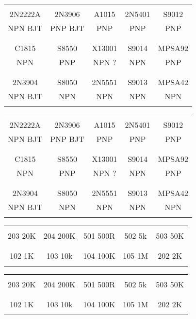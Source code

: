 \documentclass{article}
\begin{document}
\begin{center}
  \begin{tabular}{|c|c|c|c|c|}
    \hline
    &&&&\\
    2N2222A & 2N3906 & A1015 & 2N5401 & S9012 \\
    NPN BJT & PNP BJT & PNP & PNP & PNP \\
    &&&&\\\hline
    &&&&\\
    C1815 & S8550 & X13001 & S9014 & MPSA92 \\
    NPN & PNP & NPN ? & NPN & PNP \\
    &&&&\\\hline
    &&&&\\
    2N3904 & S8050 & 2N5551 & S9013 & MPSA42 \\
    NPN BJT & NPN & NPN & NPN & NPN \\
    &&&&\\\hline
  \end{tabular}
\end{center}

\begin{center}
  \begin{tabular}{|c|c|c|c|c|}
    \hline
    &&&&\\
    2N2222A & 2N3906 & A1015 & 2N5401 & S9012 \\
    NPN BJT & PNP BJT & PNP & PNP & PNP \\
    &&&&\\\hline
    &&&&\\
    C1815 & S8550 & X13001 & S9014 & MPSA92 \\
    NPN & PNP & NPN ? & NPN & PNP \\
    &&&&\\\hline
    &&&&\\
    2N3904 & S8050 & 2N5551 & S9013 & MPSA42 \\
    NPN BJT & NPN & NPN & NPN & NPN \\
    &&&&\\\hline
  \end{tabular}
\end{center}

\vspace*{20mm}

\begin{center}
  \begin{tabular}{|c|c|c|c|c|}
    \hline
    &&&&\\
    203 20K & 204 200K & 501 500R & 502 5k & 503 50K\\
    &&&&\\\hline
    &&&&\\
    102 1K & 103 10k & 104 100K & 105 1M & 202 2K \\
    &&&&\\\hline
  \end{tabular}
\end{center}

\begin{center}
  \begin{tabular}{|c|c|c|c|c|}
    \hline
    &&&&\\
    203 20K & 204 200K & 501 500R & 502 5k & 503 50K\\
    &&&&\\\hline
    &&&&\\
    102 1K & 103 10k & 104 100K & 105 1M & 202 2K \\
    &&&&\\\hline
  \end{tabular}
\end{center}
\end{document}
